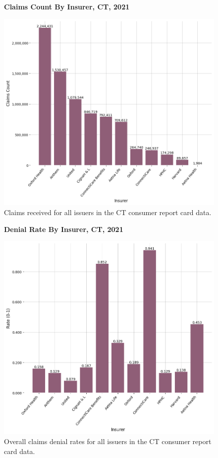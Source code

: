\documentclass[12pt, a4paper,twoside]{report}
\theoremstyle{plain} %
\theoremstyle{definition} %
\theoremstyle{remark} %
\numberwithin{equation}{chapter}
\begin{document}
		\begin{figure}[h!]
			\centering
			\textbf{Claims Count By Insurer, CT, 2021}\par\medskip
			\includegraphics[width=\columnwidth]{images/ct_claims/claims_by_insurer.png}
			\caption{Claims received for all issuers in the CT consumer report card data.}
			\label{ctinsurerclaims}
		\end{figure}
		
		\clearpage
		
		
		\begin{figure}[h!]
			\centering
			\textbf{Denial Rate By Insurer, CT, 2021}\par\medskip
			\includegraphics[width=\columnwidth]{images/ct_claims/denial_rate_by_insurer.png}
			\caption{Overall claims denial rates for all issuers in the CT consumer report card data.}
			\label{ctinsurerdenialrates}
		\end{figure}
		
\end{document}
